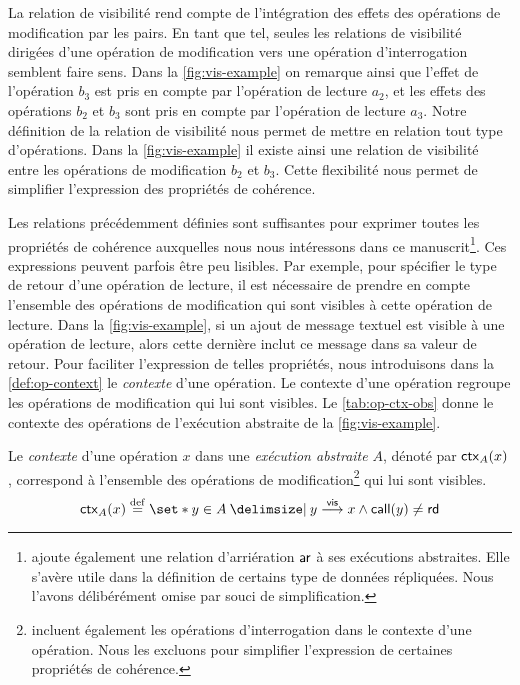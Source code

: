 La relation de visibilité rend compte de l'intégration des effets des opérations de modification par les pairs.
En tant que tel, seules les relations de visibilité dirigées d'une opération de modification vers une opération d'interrogation semblent faire sens.
Dans la \autoref{fig:vis-example} on remarque ainsi que l'effet de l'opération $b_3$ est pris en compte par l'opération de lecture $a_2$, et les effets des opérations $b_2$ et $b_3$ sont pris en compte par l'opération de lecture $a_3$.
Notre définition de la relation de visibilité nous permet de mettre en relation tout type d'opérations.
Dans la \autoref{fig:vis-example} il existe ainsi une relation de visibilité entre les opérations de modification $b_2$ et $b_3$.
Cette flexibilité nous permet de simplifier l'expression des propriétés de cohérence.

Les relations précédemment définies sont suffisantes pour exprimer toutes les propriétés de cohérence auxquelles nous nous intéressons dans ce manuscrit\footnote{\textcite{burckhardt_eventualconsistency_2014} ajoute également une relation d'arriération $\operatorname{\mathsf{ar}}$ à ses exécutions abstraites. Elle s'avère utile dans la définition de certains type de données répliquées. Nous l'avons délibérément omise par souci de simplification.}.
Ces expressions peuvent parfois être peu lisibles.
Par exemple, pour spécifier le type de retour d'une opération de lecture, il est nécessaire de prendre en compte l'ensemble des opérations de modification qui sont visibles à cette opération de lecture.
Dans la \autoref{fig:vis-example}, si un ajout de message textuel est visible à une opération de lecture, alors cette dernière inclut ce message dans sa valeur de retour.
Pour faciliter l'expression de telles propriétés, nous introduisons dans la \autoref{def:op-context} le \emph{contexte} d'une opération.
Le contexte d'une opération regroupe les opérations de modification qui lui sont visibles.
Le \autoref{tab:op-ctx-obs} donne le contexte des opérations de l'exécution abstraite de la \autoref{fig:vis-example}.

\begin{definition}[Contexte]\label{def:op-context}
Le \emph{contexte} d'une opération $x$ dans une \emph{exécution abstraite} $A$, dénoté par $\operatorname{\mathsf{ctx}}_A(x)$, correspond à l'ensemble des opérations de modification\footnote{\textcite{burckhardt_eventualconsistency_2014,viotti_consistency_2016} incluent également les opérations d'interrogation dans le contexte d'une opération. Nous les excluons pour simplifier l'expression de certaines propriétés de cohérence.} qui lui sont visibles.
\begin{equation*}
    \trm{ctx}_A(x) \defeq \set*{y \in A \given y \vis x \land \trm{call}(y) \neq \trm{rd}}
\end{equation*}
\end{definition}

